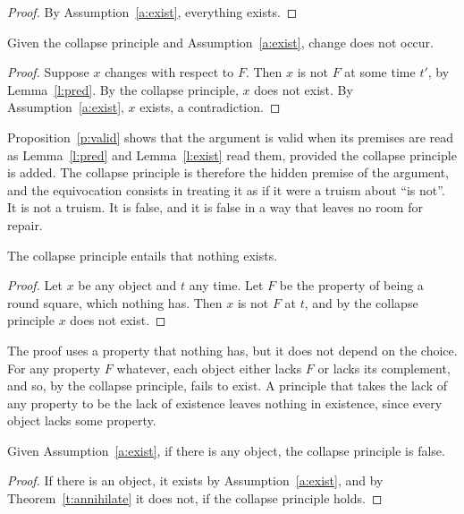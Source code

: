 \documentclass{situationist-preprint}
\begin{document}
\begin{proof}
By Assumption~\ref{a:exist}, everything exists.
\end{proof}

\begin{proposition}\label{p:valid}
Given the collapse principle and Assumption~\ref{a:exist}, change does not occur.
\end{proposition}

\begin{proof}
Suppose $x$ changes with respect to $F$. Then $x$ is not $F$ at some time $t'$, by Lemma~\ref{l:pred}. By the collapse principle, $x$ does not exist. By Assumption~\ref{a:exist}, $x$ exists, a contradiction.
\end{proof}

Proposition~\ref{p:valid} shows that the argument is valid when its premises are read as Lemma~\ref{l:pred} and Lemma~\ref{l:exist} read them, provided the collapse principle is added. The collapse principle is therefore the hidden premise of the argument, and the equivocation consists in treating it as if it were a truism about \enquote{is not}. It is not a truism. It is false, and it is false in a way that leaves no room for repair.

\begin{theorem}\label{t:annihilate}
The collapse principle entails that nothing exists.
\end{theorem}

\begin{proof}
Let $x$ be any object and $t$ any time. Let $F$ be the property of being a round square, which nothing has. Then $x$ is not $F$ at $t$, and by the collapse principle $x$ does not exist.
\end{proof}

The proof uses a property that nothing has, but it does not depend on the choice. For any property $F$ whatever, each object either lacks $F$ or lacks its complement, and so, by the collapse principle, fails to exist. A principle that takes the lack of any property to be the lack of existence leaves nothing in existence, since every object lacks some property.

\begin{corollary}\label{c:false}
Given Assumption~\ref{a:exist}, if there is any object, the collapse principle is false.
\end{corollary}

\begin{proof}
If there is an object, it exists by Assumption~\ref{a:exist}, and by Theorem~\ref{t:annihilate} it does not, if the collapse principle holds.
\end{proof}
\end{document}
